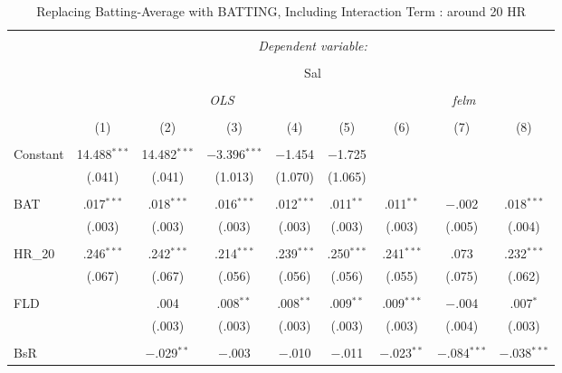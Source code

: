 
\begin{table}[H] \centering 
  \caption{Replacing Batting-Average with BATTING, Including Interaction Term
          : around 20 HR} 
  \label{HR20_C} 
\tiny 
\begin{tabular}{@{\extracolsep{5pt}}lcccccccc} 
\\[-1.8ex]\hline 
\hline \\[-1.8ex] 
 & \multicolumn{8}{c}{\textit{Dependent variable:}} \\ 
\cline{2-9} 
\\[-1.8ex] & \multicolumn{8}{c}{Sal} \\ 
\\[-1.8ex] & \multicolumn{5}{c}{\textit{OLS}} & \multicolumn{3}{c}{\textit{felm}} \\ 
\\[-1.8ex] & (1) & (2) & (3) & (4) & (5) & (6) & (7) & (8)\\ 
\hline \\[-1.8ex] 
 Constant & 14.488$^{***}$ & 14.482$^{***}$ & $-$3.396$^{***}$ & $-$1.454 & $-$1.725 &  &  &  \\ 
  & (.041) & (.041) & (1.013) & (1.070) & (1.065) &  &  &  \\ 
  & & & & & & & & \\ 
 BAT & .017$^{***}$ & .018$^{***}$ & .016$^{***}$ & .012$^{***}$ & .011$^{**}$ & .011$^{**}$ & $-$.002 & .018$^{***}$ \\ 
  & (.003) & (.003) & (.003) & (.003) & (.003) & (.003) & (.005) & (.004) \\ 
  & & & & & & & & \\ 
 HR\_20 & .246$^{***}$ & .242$^{***}$ & .214$^{***}$ & .239$^{***}$ & .250$^{***}$ & .241$^{***}$ & .073 & .232$^{***}$ \\ 
  & (.067) & (.067) & (.056) & (.056) & (.056) & (.055) & (.075) & (.062) \\ 
  & & & & & & & & \\ 
 FLD &  & .004 & .008$^{**}$ & .008$^{**}$ & .009$^{**}$ & .009$^{***}$ & $-$.004 & .007$^{*}$ \\ 
  &  & (.003) & (.003) & (.003) & (.003) & (.003) & (.004) & (.003) \\ 
  & & & & & & & & \\ 
 BsR &  & $-$.029$^{**}$ & $-$.003 & $-$.010 & $-$.011 & $-$.023$^{**}$ & $-$.084$^{***}$ & $-$.038$^{***}$ \\ 

\end{tabular}
\end{table}
